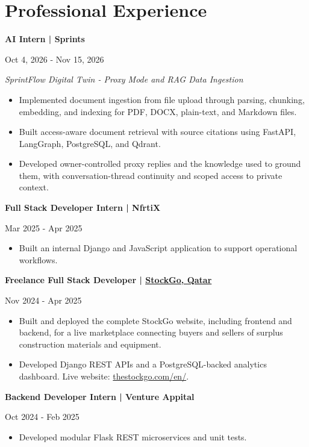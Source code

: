 \documentclass[11pt,letterpaper]{article}
\newcommand{\entry}[2]{\needspace{4\baselineskip}\textbf{#1}\par #2\par}
\newcommand{\gap}{\vspace{5pt}}
\begin{document}
\section{Professional Experience}
\entry{AI Intern | Sprints}{Oct 4, 2026 - Nov 15, 2026}
\textit{SprintFlow Digital Twin - Proxy Mode and RAG Data Ingestion}
\begin{itemize}
\item Implemented document ingestion from file upload through parsing, chunking, embedding, and indexing for PDF, DOCX, plain-text, and Markdown files.
\item Built access-aware document retrieval with source citations using FastAPI, LangGraph, PostgreSQL, and Qdrant.
\item Developed owner-controlled proxy replies and the knowledge used to ground them, with conversation-thread continuity and scoped access to private context.
\end{itemize}
\gap
\entry{Full Stack Developer Intern | NfrtiX}{Mar 2025 - Apr 2025}
\begin{itemize}
\item Built an internal Django and JavaScript application to support operational workflows.
\end{itemize}
\gap
\entry{Freelance Full Stack Developer | \href{https://www.thestockgo.com/en/}{StockGo, Qatar}}{Nov 2024 - Apr 2025}
\begin{itemize}
\item Built and deployed the complete StockGo website, including frontend and backend, for a live marketplace connecting buyers and sellers of surplus construction materials and equipment.
\item Developed Django REST APIs and a PostgreSQL-backed analytics dashboard. Live website: \href{https://www.thestockgo.com/en/}{thestockgo.com/en/}.
\end{itemize}
\gap
\entry{Backend Developer Intern | Venture Appital}{Oct 2024 - Feb 2025}
\begin{itemize}
\item Developed modular Flask REST microservices and unit tests.
\end{itemize}

\newpage
\end{document}
